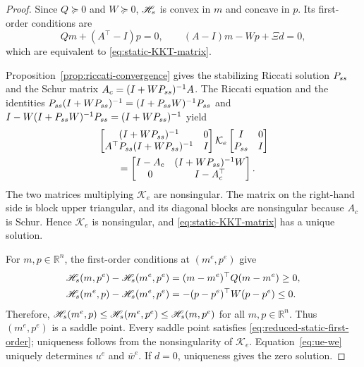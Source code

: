 \documentclass[10pt,a4paper]{amsart}
\begin{document}
\begin{proof}
Since \(Q\succeq0\) and \(W\succeq0\),
	\(\mathscr H_{\rm s}\) is convex in \(m\) and concave in \(p\). Its
	first-order conditions are
	\begin{equation}
		Qm+(A^\top-I)p=0,
		\qquad
		(A-I)m-Wp+\Xi d=0,
		\label{eq:reduced-static-first-order}
	\end{equation}
	which are equivalent to \eqref{eq:static-KKT-matrix}.
	
	Proposition~\ref{prop:riccati-convergence} gives the stabilizing Riccati
	solution \(P_{\rm ss}\) and the Schur matrix
	\(A_c=(I+WP_{\rm ss})^{-1}A\). The Riccati equation and the identities
	\(
	P_{\rm ss}(I+WP_{\rm ss})^{-1}
	=(I+P_{\rm ss}W)^{-1}P_{\rm ss}
	\)
	and
	\(
	I-W(I+P_{\rm ss}W)^{-1}P_{\rm ss}
	=(I+WP_{\rm ss})^{-1}
	\)
	yield
	\begin{equation*}
		\begin{aligned}
			&
			\begin{bmatrix}
				(I+WP_{\rm ss})^{-1}&0\\
				A^\top P_{\rm ss}(I+WP_{\rm ss})^{-1}&I
			\end{bmatrix}
			\mathcal K_e
			\begin{bmatrix}
				I&0\\
				P_{\rm ss}&I
			\end{bmatrix}\\
			&\qquad=
			\begin{bmatrix}
				I-A_c&(I+WP_{\rm ss})^{-1}W\\
				0&I-A_c^\top
			\end{bmatrix}.
		\end{aligned}
	\end{equation*}
	The two matrices multiplying \(\mathcal K_e\) are nonsingular. The matrix on
	the right-hand side is block upper triangular, and its diagonal blocks are
	nonsingular because \(A_c\) is Schur. Hence \(\mathcal K_e\) is nonsingular,
	and \eqref{eq:static-KKT-matrix} has a unique solution.
	
For \(m,p\in\mathbb R^n\), the first-order conditions at
	\((m^e,p^e)\) give
	\begin{align*}
		&\mathscr H_{\rm s}(m,p^e)-\mathscr H_{\rm s}(m^e,p^e)=(m-m^e)^\top Q(m-m^e)\ge0,\\
		&\mathscr H_{\rm s}(m^e,p)-\mathscr H_{\rm s}(m^e,p^e)=-(p-p^e)^\top W(p-p^e)\le0.
		\label{eq:static-saddle-max}
	\end{align*}
	Therefore, $\mathscr H_{\rm s}(m^e,p)
			\le \mathscr H_{\rm s}(m^e,p^e)\le \mathscr H_{\rm s}(m,p^e)$ for all
			$m,p\in\mathbb R^n$.
	Thus \((m^e,p^e)\) is a saddle point. Every saddle point satisfies
	\eqref{eq:reduced-static-first-order}; uniqueness follows from the
	nonsingularity of \(\mathcal K_e\). Equation~\eqref{eq:ue-we} uniquely
	determines \(u^e\) and \(\bar w^e\). If \(d=0\), uniqueness gives the zero
	solution.
\end{proof}
\end{document}

